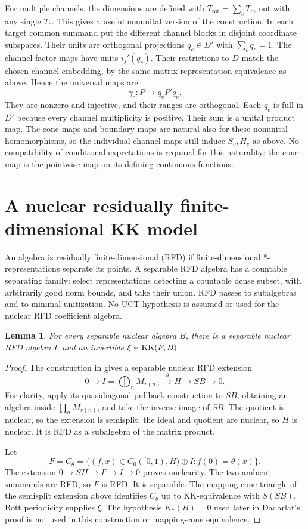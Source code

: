 \documentclass[11pt,letterpaper]{amsart}
\newtheorem{lemma}[theorem]{Lemma}
\theoremstyle{remark}\newtheorem{remark}[theorem]{Remark}
\begin{document}
For multiple channels, the dimensions are defined with
$T_{\mathrm{tot}}=\sum_cT_c$, not with any single $T_c$.
This gives a useful nonunital version of the construction. In each target
common summand put the different channel blocks in disjoint coordinate
subspaces. Their units are orthogonal projections $q_c\in D'$ with
$\sum_cq_c=1$. The channel factor maps have units $i_j'(q_c)$.
Their restrictions to $D$ match the chosen channel embedding, by the same
matrix representation equivalence as above. Hence the universal maps are
\[
                    \gamma_c:P\longrightarrow q_cP'q_c.
\]
They are nonzero and injective, and their ranges are orthogonal. Each
$q_c$ is full in $D'$ because every channel multiplicity is positive.
Their sum is a unital product map. The cone maps and boundary maps are
natural also for these nonunital homomorphisms, so the individual channel
maps still induce $S_c,H_c$ as above. No compatibility of conditional
expectations is required for this naturality: the cone map is the
pointwise map on its defining continuous functions.


\section{A nuclear residually finite-dimensional KK model}
An algebra is residually finite-dimensional (RFD) if finite-dimensional
*-representations separate its points. A separable RFD algebra has a
countable separating family: select representations detecting a countable
dense subset, with arbitrarily good norm bounds, and take their union.
RFD passes to subalgebras and to minimal unitization. No UCT hypothesis is assumed or used for the nuclear RFD
coefficient algebra.

\begin{lemma}\label{lem:rfd}
For every separable nuclear algebra $B$, there is a separable nuclear
RFD algebra $F$ and an invertible $\xi\in\operatorname{KK}(F,B)$.
\end{lemma}
\begin{proof}
The construction in \cite[Lemma 2.4 and proof of Theorem 1.2]{Dadarlat}
gives a separable nuclear RFD extension
\[
       0\longrightarrow I=\bigoplus_nM_{r(n)}
       \xrightarrow{\theta} H\longrightarrow SB\longrightarrow0.
\]
For clarity, apply its quasidiagonal pullback construction to
$\widetilde{SB}$, obtaining an algebra inside $\prod_nM_{r(n)}$,
and take the inverse image of $SB$. The quotient is nuclear, so the
extension is semisplit; the ideal and quotient are nuclear, so $H$ is
nuclear. It is RFD as a subalgebra of the matrix product.

Let
\[
 F=C_\theta=\{(f,x)\in C_0([0,1),H)\oplus I:f(0)=\theta(x)\}.
\]
The extension $0\to SH\to F\to I\to0$ proves nuclearity.
The two ambient summands are RFD, so $F$ is RFD. It is separable.
The mapping-cone triangle of the semisplit extension above identifies
$C_\theta$ up to KK-equivalence with $S(SB)$. Bott periodicity supplies
$\xi$. The hypothesis $K_*(B)=0$ used later in Dadarlat's proof is not
used in this construction or mapping-cone equivalence.
\end{proof}
\end{document}
